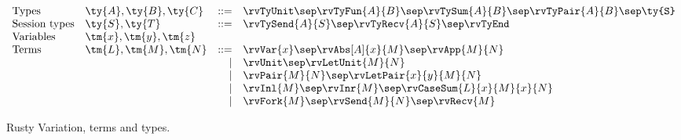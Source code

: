 \begin{figure*}
  \begin{mdframed}
    \[
    \begin{array}{llrl}
      \text{Types}
      &\ty{A}, \ty{B}, \ty{C}
      &::=& \rvTyUnit
            \sep \rvTyFun{A}{B}
            \sep \rvTySum{A}{B}
            \sep \rvTyPair{A}{B}
            \sep \texttt{\ty{S}}
      \\
      \text{Session types}
      &\ty{S}, \ty{T}
      &::=& \rvTySend{A}{S}
            \sep \rvTyRecv{A}{S}
            \sep \rvTyEnd
      \\
      \text{Variables}
      &\tm{x}, \tm{y}, \tm{z}
      \\
      \text{Terms}
      &\tm{L}, \tm{M}, \tm{N}
      &::=& \rvVar{x}
            \sep \rvAbs[A]{x}{M}
            \sep \rvApp{M}{N}
      \\
      &
      &\mid& \rvUnit
             \sep \rvLetUnit{M}{N}
     \\
      &
      &\mid& \rvPair{M}{N}
             \sep \rvLetPair{x}{y}{M}{N}
      \\
      &
      &\mid& \rvInl{M}
             \sep \rvInr{M}
             \sep \rvCaseSum{L}{x}{M}{x}{N}
      \\
      &
      &\mid& \rvFork{M}
             \sep \rvSend{M}{N}
             \sep \rvRecv{M}
    \end{array}
    \]
  \end{mdframed}
  \caption{Rusty Variation, terms and types.}
  \label{fig:rv-syntax}
\end{figure*}
